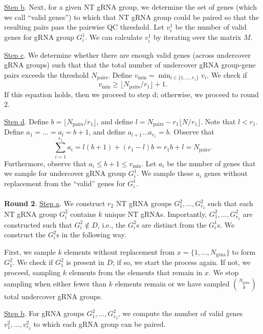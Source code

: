 \documentclass[12pt]{article}
\begin{document}
\underline{Step b}. Next, for a given NT gRNA group, we determine the set of genes (which we call ``valid genes'') to which that NT gRNA group could be paired so that the resulting pairs pass the pairwise QC threshold. Let $v^1_i$ be the number of valid genes for gRNA group $G^1_i$. We can calculate $v^1_i$ by iterating over the matrix $M$.

\underline{Step c}. We determine whether there are enough valid genes (across undercover gRNA groups) such that that the total number of undercover gRNA group-gene pairs exceeds the threshold $N_\textrm{pairs}.$ Define $v_\textrm{min} = \min_{i \in \{1, \dots, r_1\}} v_i.$ We check if
\begin{equation}
v_\textrm{min} \geq \lfloor N_\textrm{pairs}/r_1 \rfloor + 1.
\end{equation}
If this equation holds, then we proceed to step d; otherwise, we proceed to round 2.

\underline{Step d}. Define $b = \lfloor N_\textrm{pairs}/r_1 \rfloor$, and define $l = N_\textrm{pairs} - r_1 \lfloor N / r_1 \rfloor.$ Note that $l < r_1$. Define $a_1 = \dots = a_l  = b + 1$, and define $a_{l+1} \dots a_{r_1} = b$. Observe that $$\sum_{i=1}^{r_1} a_i = l(b+1) + (r_1 - l)b= r_1 b + l = N_\textrm{pairs}.$$ Furthermore, observe that $a_i \leq b + 1 \leq v_\textrm{min}.$ Let $a_i$ be the number of genes that we sample for undercover gRNA group $G^1_i$. We sample these $a_i$ genes without replacement from the ``valid'' genes for $G^1_i$. 
\\ \\
\textbf{Round 2}.
\underline{Step a}. We construct $r_2$ NT gRNA groups $G^2_1, \dots, G^2_{r_2}$ such that each NT gRNA group $G^2_i$ contains $k$ unique NT gRNAs. Importantly, $G^2_1, \dots, G^2_{r_2}$ are constructed such that $G^2_i \notin D$, i.e., the $G^2_i$s are distinct from the $G^1_i$s. We construct the $G^2_i$s in the following way.

First, we sample $k$ elements without replacement from $x = \{1, \dots, N_\textrm{grna}\}$ to form $G^2_1$. We check if $G^2_1$ is present in $D$; if so, we start the process again. If not, we proceed, sampling $k$ elements from the elements that remain in $x$. We stop sampling when either fewer than $k$ elements remain or we have sampled $\binom{N_\textrm{grna}}{k}$ total undercover gRNA groups.

\underline{Step b}. For gRNA groups $G^2_1, \dots, G^2_{r_2}$, we compute the number of valid genes $v^2_1, \dots, v^2_{r_2}$ to which each gRNA group can be paired.
\end{document}
